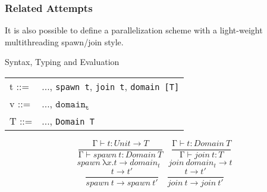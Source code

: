 \documentclass{beamer}
\begin{document}
\begin{frame}
  \frametitle{Related Attempts}

  It is also possible to define a parallelization scheme with a light-weight multithreading spawn/join style.
  \begin{block}{Syntax, Typing and Evaluation}
    \centering
  \begin{tabular}{ll}
    t ::= & ..., \texttt{spawn t}, \texttt{join t}, \texttt{domain [T]} \\
    v ::= & ..., $\mathtt{domain_t}$ \\
    T ::= & ..., \texttt{Domain T} \\
  \end{tabular}
    $$
      \frac{\texttt{Γ}\vdash t:Unit\to T}{\texttt{Γ}\vdash spawn~t:Domain~T}\quad
      \frac{\texttt{Γ}\vdash t:Domain~T}{\texttt{Γ}\vdash join~t:T}
    $$
    $$
      spawn~\texttt{λ}x.t\longrightarrow domain_t\quad join~domain_t\longrightarrow t
    $$
    $$
      \frac{t\longrightarrow t'}{spawn~t\longrightarrow spawn~t'}\quad
      \frac{t\longrightarrow t'}{join~t\longrightarrow join~t'}
    $$
  \end{block}

\end{frame}
\end{document}
